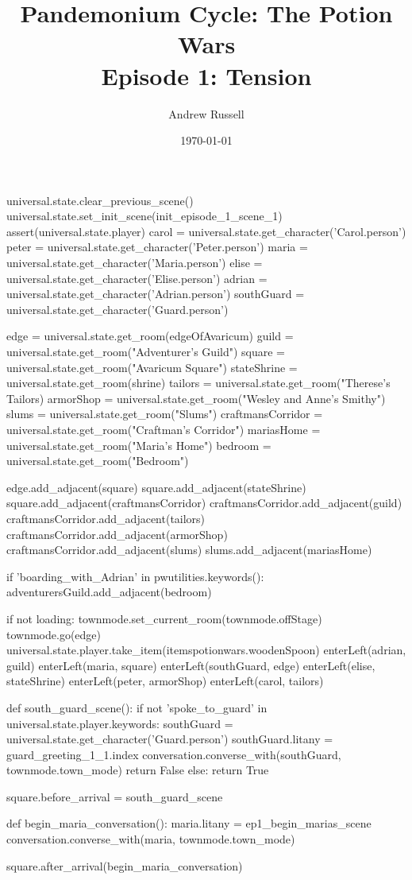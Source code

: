 \documentclass{book}
\title{Pandemonium Cycle: The Potion Wars \\ Episode 1: Tension}
\author{Andrew Russell}
\date{\today}
\begin{document}
\maketitle
\begin{openScene}
    universal.state.clear_previous_scene()
    universal.state.set_init_scene(init_episode_1_scene_1)
    assert(universal.state.player)
    carol = universal.state.get_character('Carol.person')
    peter = universal.state.get_character('Peter.person')
    maria = universal.state.get_character('Maria.person')
    elise = universal.state.get_character('Elise.person')
    adrian = universal.state.get_character('Adrian.person')
    southGuard = universal.state.get_character('Guard.person')
    
    edge = universal.state.get_room(edgeOfAvaricum)
    guild = universal.state.get_room("Adventurer's Guild")
    square = universal.state.get_room("Avaricum Square")
    stateShrine = universal.state.get_room(shrine)
    tailors = universal.state.get_room("Therese's Tailors)
    armorShop = universal.state.get_room("Wesley and Anne's Smithy")
    slums = universal.state.get_room("Slums")
    craftmansCorridor = universal.state.get_room("Craftman's Corridor")
    mariasHome = universal.state.get_room("Maria's Home")
    bedroom = universal.state.get_room("Bedroom")

    edge.add_adjacent(square)
    square.add_adjacent(stateShrine)
    square.add_adjacent(craftmansCorridor)
    craftmansCorridor.add_adjacent(guild)
    craftmansCorridor.add_adjacent(tailors)
    craftmansCorridor.add_adjacent(armorShop)
    craftmansCorridor.add_adjacent(slums)
    slums.add_adjacent(mariasHome)

    if 'boarding\_with\_Adrian' in pwutilities.keywords():
        adventurersGuild.add_adjacent(bedroom)

    if not loading:
        townmode.set_current_room(townmode.offStage)
        townmode.go(edge)
        universal.state.player.take_item(itemspotionwars.woodenSpoon)
        enterLeft(adrian, guild)
        enterLeft(maria, square)
        enterLeft(southGuard, edge)
        enterLeft(elise, stateShrine)
        enterLeft(peter, armorShop)
        enterLeft(carol, tailors)

    def south_guard_scene(): 
        if not 'spoke_to_guard' in universal.state.player.keywords:
            southGuard = universal.state.get_character('Guard.person')
            southGuard.litany = guard_greeting_1_1.index
            conversation.converse_with(southGuard, townmode.town_mode)
            return False
        else:
            return True

    square.before_arrival = south_guard_scene

    def begin_maria_conversation():
        maria.litany = ep1_begin_marias_scene
        conversation.converse_with(maria, townmode.town_mode)

    square.after_arrival(begin_maria_conversation)

\end{openScene}
\end{document}
